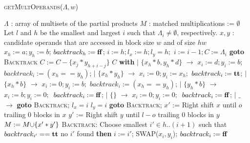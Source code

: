 \begin{algorithm}[!t]
 \caption{\textsc{getMultOperands}($\Lambda,w$)}
 \label{alg:operand}
 \begin{algorithmic}[1]
   \Require $\Lambda$ : array of multisets of the partial products
   \Ensure $M$ : matched multiplications := $\emptyset$
   \State Let $l$ and $h$ be the smallest and largest $i$ such that $\Lambda_i\neq \emptyset$, respectively.
   \State $x,y$ : candidate operands that are accessed in block size $w$ and of size $hw$
   \State $x_h := a; y_h := b$; $backtrack_h := \mathbf{ff}$; 
   \Else
   \State \Return{ $\emptyset$}
   \EndIf
   \State $i := h;l_x := h; l_y = h;$
   \State $i := i - 1; C := \Lambda_i$
    {\bf goto }{\textsc{Backtrack}}
   \State $C := C - \{x_j*y_{h+i-j}\}$
   \EndIf
   \EndFor
    $C$ {\bf with}
   \State\quad $\mid$ $\{x_h*b,y_h*d\}$ $\rightarrow$ $x_i := d; y_i := b$;
   $backtrack_i := (x_h == y_h)$; 
   \State\quad $\mid$ $\{x_h*y_h\}$ $\rightarrow$ $x_i := 0; y_i := x_h;$
   $backtrack_i := \mathbf{tt}$; 
   \State \quad$\mid$ $\{x_h*b\}$ $\rightarrow$ $x_i := 0; y_i := b;$
   $backtrack_i := (x_h == y_h)$; 
   \State \quad $\mid$ $\{y_h*b\}$ $\rightarrow$ $x_i := b; y_i := 0;$\
   $backtrack_i := \mathbf{ff}$; 
   \State \quad $\mid$ $\{\}$ $\rightarrow$ $x_i := 0; y_i := 0;$\
   $backtrack_i := \mathbf{ff}$; 
   \State \quad $\mid$ $\_$ $\rightarrow$ {\bf goto }{\textsc{Backtrack}};
   \IIf{$x_i \neq 0$} $l_x = i$
   \IIf{$y_i \neq 0$} $l_y = i$
    {\bf goto }{\textsc{Backtrack}};
   \If{ $i == 1 $}
   \For{$o \in 0..(l-1)$} %
   \State $x'$ := Right shift $x$ until $o$ trailing $0$ blocks in $x$
   \State $y'$ := Right shift $y$ until $l-o$ trailing $0$ blocks in $y$
   \State $M := M {\cup} \{x' * y'\}$
   \EndFor
   \Else
   \EndIf
   \State \textsc{Backtrack:}
   \State \quad Choose smallest $i' \in h..(i+1)$ such that $backtrack_{i'} == \mathbf{tt}$
   \State \quad {\bf if} no $i'$ found {\bf then} 
   \State \quad $i := i'$; \textsc{SWAP}($x_i,y_i$); $backtrack_{i} := \mathbf{ff}$
   \EndWhile
 \end{algorithmic}
\end{algorithm}  



